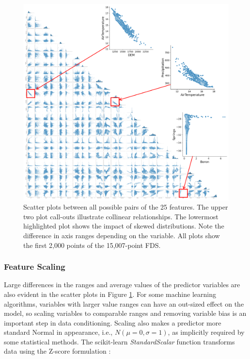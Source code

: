 \begin{figure}[!htp]
\centering
\includegraphics[width=\textwidth]{templates/images/Figure-Scatterplot_Unscaled_Features.png}
\caption[Unscaled FDS scatter plots]{Scatter plots between all possible pairs of the 25 features. The upper two plot call-outs illustrate collinear relationships. The lowermost highlighted plot shows the impact of skewed distributions. Note the difference in axis ranges depending on the variable. All plots show the first 2,000 points of the 15,007-point FDS.}
\label{fig:unscaled_scatter}
\end{figure}

\subsubsection{Feature Scaling}
Large differences in the ranges and average values of the predictor variables are also evident in the scatter plots in Figure \ref{fig:unscaled_scatter}. For some machine learning algorithms, variables with larger value ranges can have an out-sized effect on the model, so scaling variables to comparable ranges and removing variable bias is an important step in data conditioning. Scaling also makes a predictor more standard Normal in appearance, i.e., $N(\mu=0, \sigma=1)$, as implicitly required by some statistical methods. The scikit-learn \textit{StandardScalar} function transforms data using the Z-score formulation \citep{scikit-learn_sklearnpreprocessingstandardscaler_2021}:

